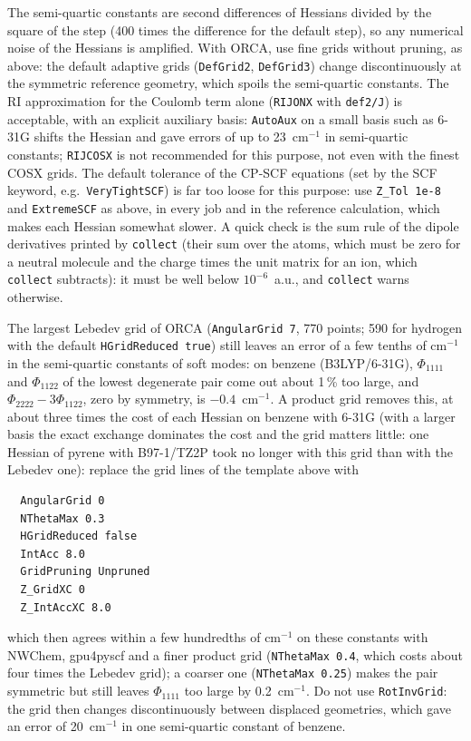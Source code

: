 The semi-quartic constants are second differences of Hessians divided by
the square of the step (400 times the difference for the default step),
so any numerical noise of the Hessians is amplified. With ORCA, use fine
grids without pruning, as above: the default adaptive grids
(\texttt{DefGrid2}, \texttt{DefGrid3}) change discontinuously at the
symmetric reference geometry, which spoils the semi-quartic constants.
The RI approximation for the Coulomb term alone (\texttt{RIJONX} with
\texttt{def2/J}) is acceptable, with an explicit auxiliary basis: \texttt{AutoAux} on a small basis such as 6-31G shifts the Hessian and gave errors of up to 23~cm$^{-1}$ in semi-quartic constants; \texttt{RIJCOSX} is not recommended for
this purpose, not even with the finest COSX grids. The default tolerance of the CP-SCF equations (set by the SCF keyword,
e.g.\ \texttt{VeryTightSCF}) is far too loose for this purpose: use
\texttt{Z\_Tol 1e-8} and \texttt{ExtremeSCF} as above, in every job and
in the reference calculation, which makes each Hessian somewhat slower.
A quick check is the sum rule of the dipole derivatives printed by
\texttt{collect} (their sum over the atoms, which must be zero for a
neutral molecule and the charge times the unit matrix for an ion, which
\texttt{collect} subtracts): it must be well below $10^{-6}$~a.u., and
\texttt{collect} warns otherwise.

The largest Lebedev grid of ORCA (\texttt{AngularGrid 7}, 770 points;
590 for hydrogen with the default \texttt{HGridReduced true}) still
leaves an error of a few tenths of cm$^{-1}$ in the semi-quartic constants
of soft modes: on benzene (B3LYP/6-31G), $\Phi_{1111}$ and $\Phi_{1122}$
of the lowest degenerate pair come out about 1\,\% too large, and
$\Phi_{2222}-3\Phi_{1122}$, zero by symmetry, is $-0.4$~cm$^{-1}$. A
product grid removes this, at about three times the cost of each Hessian on benzene with 6-31G (with a larger basis the exact exchange dominates the cost and the grid matters little: one Hessian of pyrene with B97-1/TZ2P took no longer with this grid than with the Lebedev one):
replace the grid lines of the template above with
\begin{lstlisting}
  AngularGrid 0
  NThetaMax 0.3
  HGridReduced false
  IntAcc 8.0
  GridPruning Unpruned
  Z_GridXC 0
  Z_IntAccXC 8.0
\end{lstlisting}
which then agrees within a few hundredths of cm$^{-1}$ on these constants
with NWChem, gpu4pyscf and a finer product grid (\texttt{NThetaMax 0.4},
which costs about four times the Lebedev grid); a coarser one
(\texttt{NThetaMax 0.25}) makes the pair symmetric but still leaves
$\Phi_{1111}$ too large by 0.2~cm$^{-1}$. Do not use \texttt{RotInvGrid}: the grid then changes
discontinuously between displaced geometries, which gave an error of
20~cm$^{-1}$ in one semi-quartic constant of benzene.

